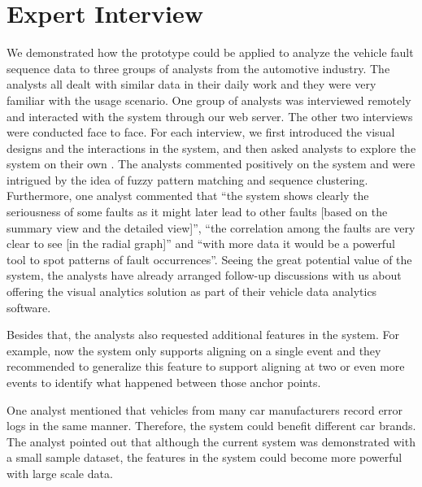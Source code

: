 \section{Expert Interview}
\label{section:feedback}

We demonstrated how the prototype could be applied to analyze the vehicle fault sequence data to three groups of analysts from the automotive industry. The analysts all dealt with similar data in their daily work and they were very familiar with the usage scenario. One group of analysts was interviewed remotely and interacted with the system through our web server. The other two interviews were conducted face to face. For each interview, we first introduced the visual designs and the interactions in the system, and then asked analysts to explore the system on their own .  The analysts commented positively on the system and were intrigued by the idea of fuzzy pattern matching and sequence clustering.  Furthermore, one analyst commented that ``the system shows clearly the seriousness of some faults as it might later lead to other faults [based on the summary view and the detailed view]'', ``the correlation among the faults are very clear to see [in the radial graph]'' and ``with more data it would be a powerful tool to spot patterns of fault occurrences''. Seeing the great potential value of the system, the analysts have already arranged follow-up discussions with us about offering the visual analytics solution as part of their vehicle data analytics software.

Besides that, the analysts also requested additional features in the system. For example, now the system only supports aligning on a single event and they recommended to generalize this feature to support aligning at two or even more events to identify what happened between those anchor points.

One analyst mentioned that vehicles from many car manufacturers record error logs in the same manner. Therefore, the system could benefit different car brands. The analyst pointed out that although the current system was demonstrated with a small sample dataset, the features in the system could become more powerful with large scale data. 

